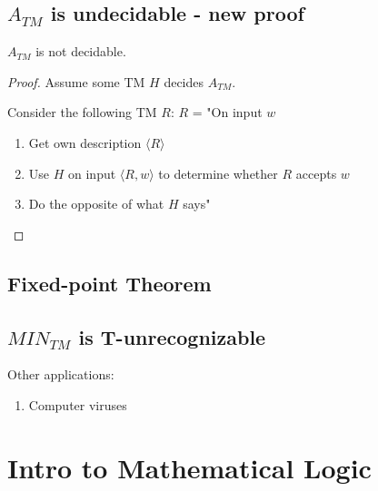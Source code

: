 \subsection{\(A_{TM}\) is undecidable - new proof}
\begin{theorem}
    \(A_{TM}\) is not decidable. 
\end{theorem}
\begin{proof}
    Assume some TM \(H\) decides \(A_{TM}\). 

    Consider the following TM \(R\):
    \(R\) = "On input \(w\)
    \begin{enumerate}
        \item Get own description \(\langle R \rangle\)
        \item Use \(H\) on input \(\langle R, w \rangle\)  to determine whether \(R\) accepts \(w\)
        \item Do the opposite of what \(H\) says"
    \end{enumerate}   
\end{proof}
    

\subsection{Fixed-point Theorem}

\subsection{\(MIN_{TM}\) is T-unrecognizable}

Other applications:
\begin{enumerate}
    \item Computer viruses
\end{enumerate}

\section{Intro to Mathematical Logic}
\begin{definition}[Goal]
    
\end{definition}


\begin{example}
    
\end{example}

